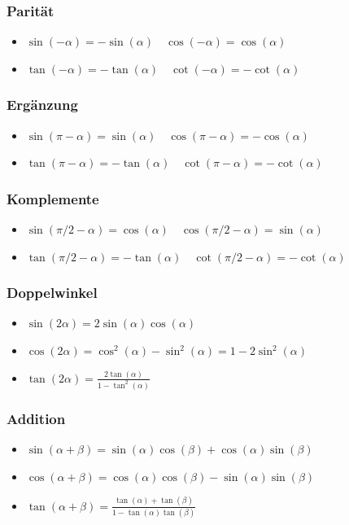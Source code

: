 \documentclass[a4paper,10pt]{article}
\begin{document}
    \subsubsection{Parität}
    \begin{itemize}
        \item $\sin(-\alpha) = - \sin(\alpha) \quad \cos(-\alpha) = \cos(\alpha)$
        \item $\tan(-\alpha) = - \tan(\alpha) \quad \cot(-\alpha) = - \cot(\alpha)$
    \end{itemize}
    
    \subsubsection{Ergänzung}
    \begin{itemize}
        \item $\sin(\pi - \alpha) = \sin(\alpha) \quad \cos(\pi - \alpha) = - \cos(\alpha)$
        \item $\tan(\pi - \alpha) = -\tan(\alpha) \quad \cot(\pi - \alpha) = - \cot(\alpha)$
    \end{itemize}
    
    
    \subsubsection{Komplemente}
    \begin{itemize}
        \item $\sin(\pi/2 - \alpha) = \cos(\alpha) \quad \cos(\pi/2 - \alpha) = \sin(\alpha)$
        \item $\tan(\pi/2 - \alpha) = -\tan(\alpha) \quad \cot(\pi/2 - \alpha) = -\cot(\alpha)$
    \end{itemize}
    
    \subsubsection{Doppelwinkel}
    \begin{itemize}
        \item $\sin(2\alpha) = 2 \sin(\alpha) \cos(\alpha)$
        \item $\cos(2\alpha) = \cos^2(\alpha) - \sin^2(\alpha) = 1 - 2 \sin^2(\alpha)$
        \item $\tan(2\alpha) = \frac{2\tan(\alpha)}{1 - \tan^2(\alpha)}$
    \end{itemize}
    
    \subsubsection{Addition}
    \begin{itemize}
        \item $\sin(\alpha + \beta) = \sin(\alpha) \cos(\beta) + \cos(\alpha) \sin(\beta)$
        \item $\cos(\alpha + \beta) = \cos(\alpha) \cos(\beta) - \sin(\alpha) \sin(\beta)$
        \item $\tan(\alpha + \beta) = \frac{\tan(\alpha) + \tan(\beta)}{1 - \tan(\alpha) \tan(\beta)}$
    \end{itemize}
    
\end{document}
